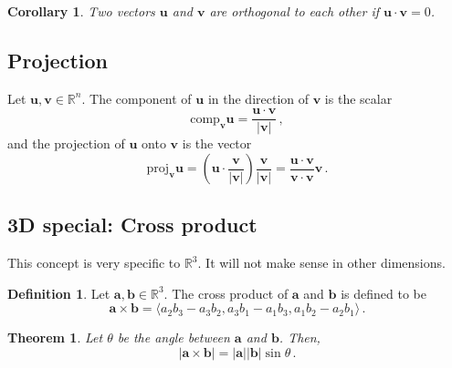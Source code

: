 \documentclass[
]{book}
\newtheorem{theorem}{Theorem}[chapter]
\newtheorem{corollary}{Corollary}[chapter]
\theoremstyle{definition}
\newtheorem{definition}{Definition}[chapter]
\theoremstyle{definition}
\theoremstyle{definition}
\theoremstyle{definition}
\theoremstyle{remark}
\begin{document}
\begin{corollary}
Two vectors \(\textbf{u}\) and \(\textbf{v}\) are orthogonal to each other
if \(\textbf{u} \cdot \textbf{v} = 0\).
\end{corollary}

\subsection*{Projection}\label{projection}


Let \(\textbf{u}, \textbf{v}\in \mathbb{R}^n\). The component of \(\textbf{u}\)
in the direction of \(\textbf{v}\) is the scalar
\begin{equation*}
\mathrm{comp}_{\mathbf{v}}\mathbf{u} = \frac{\mathbf{u}\cdot \mathbf{v}}{|\mathbf{v}|} \,,
\end{equation*}
and the projection of \(\mathbf{u}\) onto \(\mathbf{v}\) is the vector
\begin{equation*}
    \mathrm{proj}_{\mathbf{v}}\mathbf{u} 
    =\left( \mathbf{u}\cdot \frac{\mathbf{v}}{|\mathbf{v}|}\right) \frac{\mathbf{v}}{|\mathbf{v}|} 
    = \frac{\mathbf{u}\cdot \mathbf{v}}{\mathbf{v} \cdot\mathbf{v}} \mathbf{v} \,.
\end{equation*}

\subsection{3D special: Cross product}\label{d-special-cross-product}

This concept is very specific to \(\mathbb{R}^3\).
It will not make sense in other dimensions.

\begin{definition}
Let \(\mathbf{a}, \mathbf{b} \in \mathbb{R}^3\).
The cross product of \(\mathbf{a}\) and \(\mathbf{b}\) is defined to be
\begin{equation*}
    \mathbf{a} \times \mathbf{b} = \langle a_2 b_3 - a_3 b_2, a_3b_1 - a_1 b_3, a_1b_2 - a_2b_1 \rangle \,.
\end{equation*}
\end{definition}

\begin{theorem}
Let \(\theta\) be the angle between \(\mathbf{a}\) and \(\mathbf{b}\). Then,
\begin{equation*}
    | \mathbf{a} \times \mathbf{b} | = |\mathbf{a}||\mathbf{b}| \sin\theta \,.
\end{equation*}
\end{theorem}
\end{document}
